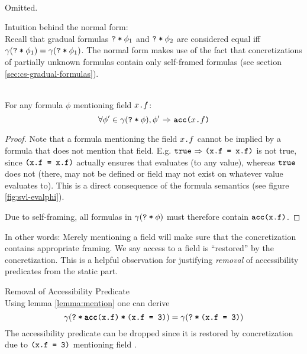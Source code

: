 \begin{proofatend}~\\
    Omitted.
    
    Intuition behind the normal form:\\
    Recall that gradual formulas $\textup{\texttt{\textup{\texttt{?}}\:*\:\ensuremath{\phi_1}}}$ and $\textup{\texttt{\textup{\texttt{?}}\:*\:\ensuremath{\phi_2}}}$ are considered equal iff $\gamma(\textup{\texttt{\textup{\texttt{?}}\:*\:\ensuremath{\phi_1}}}) = \gamma(\textup{\texttt{\textup{\texttt{?}}\:*\:\ensuremath{\phi_1}}})$.
    The normal form makes use of the fact that concretizations of partially unknown formulas contain only self-framed formulas (see section \ref{sec:cs-gradual-formulas}).
    
    \begin{lemma}\label{lemma:mention}~\\
        For any formula $\phi$ mentioning field $\textup{\texttt{$x$.$f$}}$:
        $$\forall \phi' \in \gamma(\textup{\texttt{\textup{\texttt{?}}\:*\:\ensuremath{\phi}}}), {\phi'} \,\,{\Rightarrow}\,\, {\textup{\texttt{\textbf{acc}($x$.$f$)}}}$$
    \end{lemma}
    \begin{proof}
        Note that a formula mentioning the field $\textup{\texttt{$x$.$f$}}$ cannot be implied by a formula that does not mention that field.
        E.g. ${\textup{\texttt{true}}} \,\,{\Rightarrow}\,\, {\textup{\texttt{(x.f = x.f)}}}$ is not true, since $\textup{\texttt{(x.f = x.f)}}$ actually ensures that  evaluates (to any value), whereas $\textup{\texttt{true}}$ does not (there,  may not be defined or field  may not exist on whatever value  evaluates to).
        This is a direct consequence of the formula semantics (see figure \ref{fig:svl-evalphi}).
        
        Due to self-framing, all formulas in $\gamma(\textup{\texttt{\textup{\texttt{?}}\:*\:\ensuremath{\phi}}})$ must therefore contain $\textup{\texttt{\textbf{acc}(x.f)}}$.
    \end{proof}
    In other words: Merely mentioning a field will make sure that the concretization contains appropriate framing.
    We say access to a field is “restored” by the concretization.
    This is a helpful observation for justifying \emph{removal} of accessibility predicates from the static part.
    
    \begin{example}{Removal of Accessibility Predicate}\label{ex:rem-acc}~\\
        Using lemma \ref{lemma:mention} one can derive
        \begin{displaymath}
        \gamma(\textup{\texttt{\textup{\texttt{?}}\:*\:\ensuremath{\textup{\texttt{\textup{\texttt{\textbf{acc}(x.f)}}\:*\:\textup{\texttt{(x.f = 3)}}}}}}}) = \gamma(\textup{\texttt{\textup{\texttt{?}}\:*\:\ensuremath{\textup{\texttt{(x.f = 3)}}}}})
        \end{displaymath}
        The accessibility predicate can be dropped since it is restored by concretization due to $\textup{\texttt{(x.f = 3)}}$ mentioning field .
    \end{example}
    

\end{proofatend}
